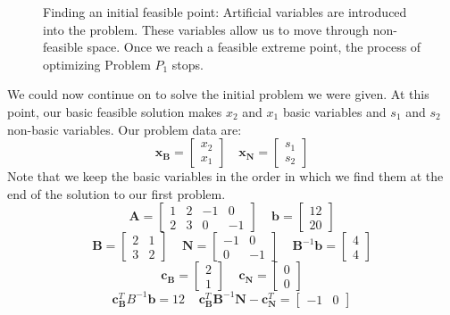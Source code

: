 \begin{example}
\begin{figure}[htbp]
\caption{Finding an initial feasible point: Artificial variables are introduced into the problem. These variables allow us to move through non-feasible space. Once we reach a feasible extreme point, the process of optimizing Problem $P_1$ stops.}
\label{fig:PhaseISimplex}
\end{figure}
\label{ex:ArtificialVariables}

We could now continue on to solve the initial problem we were given. At this point, our basic feasible solution makes $x_2$ and $x_1$ basic variables and $s_1$ and $s_2$ non-basic variables. Our problem data are:
\begin{displaymath}
\mathbf{x}_\mathbf{B} = \begin{bmatrix}x_2 \\ x_1\end{bmatrix}\quad
\mathbf{x}_\mathbf{N} = \begin{bmatrix}s_1 \\ s_2\end{bmatrix}
\end{displaymath}
Note that we keep the basic variables in the order in which we find them at the end of the solution to our first problem.  
\begin{displaymath}
\mathbf{A} = \begin{bmatrix}
1 & 2 & -1 & 0 \\
2 & 3 & 0 & -1
\end{bmatrix}\;\;\;\;
\mathbf{b} = \begin{bmatrix}
12\\20
\end{bmatrix}
\end{displaymath}
\begin{displaymath}
\mathbf{B} = \begin{bmatrix}
2 & 1\\
3 & 2
\end{bmatrix}\;\;\;\;
\mathbf{N} = \begin{bmatrix}
-1 & 0\\
 0 & -1
\end{bmatrix}\;\;\;\;
\mathbf{B}^{-1}\mathbf{b} = 
\begin{bmatrix}
4\\4
\end{bmatrix}
\end{displaymath}
\begin{displaymath}
\mathbf{c_B} = \begin{bmatrix}
2\\
1
\end{bmatrix}\;\;\;\;
\mathbf{c_N} = \begin{bmatrix}
0\\0
\end{bmatrix}
\end{displaymath}
\begin{displaymath}
\mathbf{c}_\mathbf{B}^TB^{-1}\mathbf{b} = 12\;\;\;\;
\mathbf{c}_\mathbf{B}^T\mathbf{B}^{-1}\mathbf{N} - \mathbf{c}_{\mathbf{N}}^T = \begin{bmatrix}
-1 & 0
\end{bmatrix}
\end{displaymath}


\end{example}
